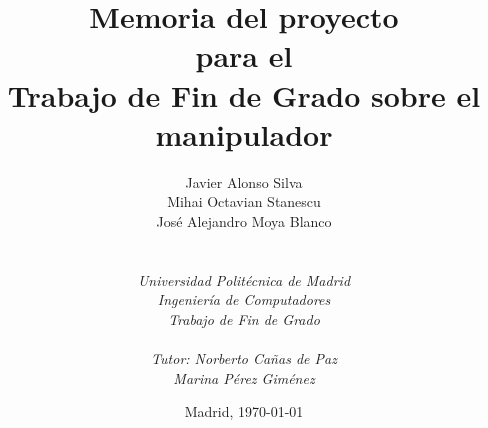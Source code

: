 
\def\Company{Consultancy}
\def\Institute{\textit{Universidad Politécnica de Madrid}}
\def\Course{\textit{Ingeniería de Computadores}}
\def\Module{\textit{Trabajo de Fin de Grado}}
\def\Docent{\textit{Tutor: Norberto Cañas de Paz} \\ \textit{Marina Pérez Giménez}}
\def\Assistant{}

\def\BoldTitle{Memoria del proyecto}

\def\Subtitle{para el \\ Trabajo de Fin de Grado sobre el manipulador \pArm{} \\}
\def\Authors{Javier Alonso Silva \\ Mihai Octavian Stanescu \\ José Alejandro Moya Blanco } 
\def\Shortname{J. Alonso, M. Stanescu, A. Moya}


\title{\textbf{\BoldTitle}\\\Subtitle}
\author{\Authors \\ \\ \\ \Institute\\ \Course\\ \Module\\ \\ \Docent}
\date{Madrid, \today{}}

